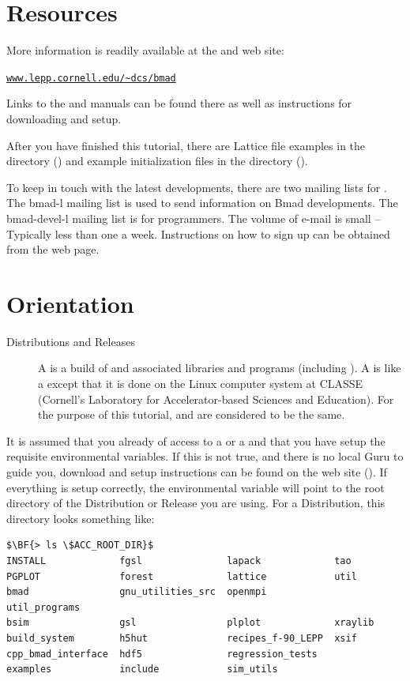 \documentclass{hitec}
\newcommand{\Section}[1]{\section{#1}\vspace*{-1ex}}
\newenvironment{display}
  {\vspace*{-1.5ex} \begin{alltt}}
  {\end{alltt} \vspace*{-1.0ex}}
\begin{document}
\newpage

\Section{Resources}
\label{s:resources}

More information is readily available at the \bmad and \tao web site:
\begin{display}
  \url{www.lepp.cornell.edu/~dcs/bmad}
\end{display}
Links to the \bmad and \tao manuals can be found there as well as instructions for
downloading and setup.

After you have finished this tutorial, there are Lattice file examples in the 
directory () and example \tao initialization files in the 
directory ().

To keep in touch with the latest \bmad developments, there are two mailing lists for
\bmad.  The bmad-l mailing list is used to send information on Bmad developments.  The
bmad-devel-l mailing list is for programmers. The volume of e-mail is small -- Typically
less than one a week. Instructions on how to sign up can be obtained from the \bmad web
page.

\Section{Orientation}
\label{s:orientation}

  \begin{description}
  \item[Distributions and Releases] \Newline
A  is a build of \bmad and associated libraries and programs (including \tao).  A
 is like a  except that it is done on the Linux computer system at
CLASSE (Cornell's Laboratory for Accelerator-based Sciences and Education). For the purpose of this
tutorial,  and  are considered to be the same.
  \end{description}

It is assumed that you already of access to a  or a  and that
you have setup the requisite environmental variables. If this is not true, and there is no
local \bmad Guru to guide you, download and setup instructions can be found on the \bmad web
site (). If everything is setup correctly, the environmental variable
 will point to the root directory of the Distribution or Release you are
using. For a Distribution, this directory looks something like:
\begin{lstlisting}[mathescape]
$\BF{> ls \$ACC_ROOT_DIR}$
INSTALL             fgsl               lapack             tao
PGPLOT              forest             lattice            util
bmad                gnu_utilities_src  openmpi            util_programs
bsim                gsl                plplot             xraylib
build_system        h5hut              recipes_f-90_LEPP  xsif
cpp_bmad_interface  hdf5               regression_tests
examples            include            sim_utils
\end{lstlisting}
\end{document}
